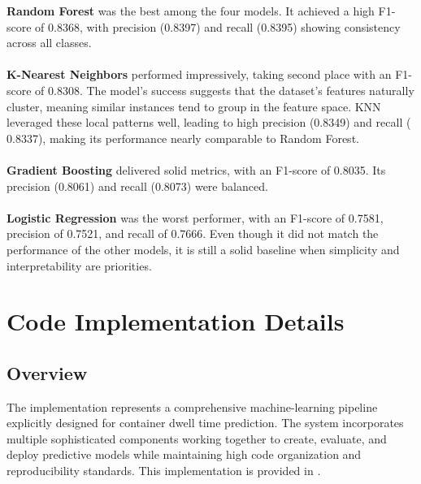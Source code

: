 			\textbf{Random Forest} was the best among the four models. It achieved a high F1-score of 0.8368,
			with precision (0.8397) and recall (0.8395) showing consistency across all classes.
			\\
			\\
			\textbf{K-Nearest Neighbors} performed impressively, taking second place with an F1-score of 0.8308. The
			model's
			success suggests that the dataset's features naturally cluster, meaning similar instances tend to group in
			the
			feature space. KNN leveraged these local patterns well, leading to high precision (0.8349) and recall (
			0.8337),
			making its performance nearly comparable to Random Forest.
			\\
			\\
			\textbf{Gradient Boosting}
			delivered solid metrics, with an F1-score of 0.8035. Its precision (0.8061) and recall (0.8073) were
			balanced.
			\\
			\\
			\textbf{Logistic Regression} was the worst performer, with an F1-score of 0.7581, precision of 0.7521, and
			recall of 0.7666. Even though it did not match the performance of the other models, it is still a solid
			baseline
			when simplicity and interpretability are priorities.


	\section{Code Implementation Details}

		\subsection{Overview}
			The implementation represents a comprehensive machine-learning pipeline explicitly designed for container
			dwell time prediction. The system incorporates multiple sophisticated components working together to
			create, evaluate, and deploy predictive models while maintaining high code organization and reproducibility
			standards. This implementation is provided in \cite{githubrepo}.

